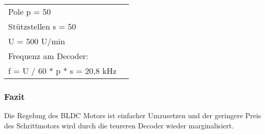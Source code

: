\par\bigskip
\begin{tabularx}{\textwidth} {@{\hspace{1cm}}lX@{}}
	Pole p = 50 \\
	Stützstellen s = 50 \\
    U = 500 U/min \\
    Frequenz am Decoder: \\
    f = U / 60 * p * s = 20,8 kHz \\
\end{tabularx}

\subsubsection{Fazit}
Die Regelung des BLDC Motors ist einfacher Umzusetzen und der geringere Preis des Schrittmotors wird durch die teureren Decoder wieder marginalisiert.


\newpage

